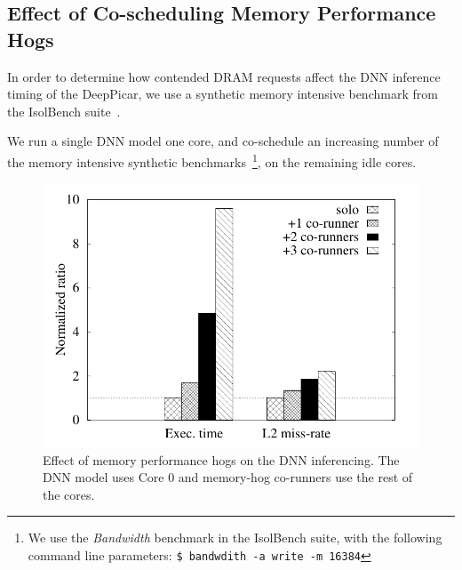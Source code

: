 
\subsection{Effect of Co-scheduling Memory Performance Hogs}\label{sec:eval-memhog}

In order to determine how contended DRAM requests affect the DNN
inference timing of the DeepPicar, we use a synthetic memory
intensive benchmark from the IsolBench suite~\cite{Valsan2016}.

We run a single DNN model one core, and
co-schedule an increasing number of the memory intensive synthetic
benchmarks~\footnote{We use the \emph{Bandwidth} benchmark in the
  IsolBench suite, with the following command line parameters: \texttt{\$
  bandwdith -a write -m 16384}}, on the remaining idle cores.

\begin{figure}[h]
  \centering
  \includegraphics[width=.45\textwidth]{figs/perf_vs_bandwidth}
  \caption{Effect of memory performance hogs on the DNN
    inferencing. The DNN model uses Core 0 and memory-hog co-runners
    use the rest of the cores.}
  \label{fig:}
\end{figure}



